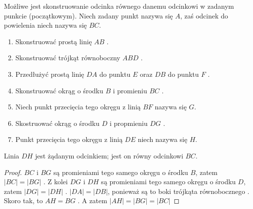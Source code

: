 \documentclass[12pt, a4paper]{scrartcl}
\begin{document}
\begin{theorem}

Możliwe jest skonstruowanie odcinka równego danemu odcinkowi w zadanym punkcie
(początkowym). Niech zadany punkt nazywa się \(A\), zaś odcinek do powielenia
niech nazywa się \(BC\).

\begin{enumerate}
    \item Skonstruować prostą linię \(AB\) .
    \item Skonstruować trójkąt równoboczny \(ABD\) .
    \item Przedłużyć prostą linię \(DA\) do punktu \(E\) oraz \(DB\) do punktu \(F\)
        .
    \item Skonstruować okrąg o środku \(B\) i promieniu \(BC\) .
    \item Niech punkt przecięcia tego okręgu z linią \(BF\) nazywa się \(G\).
    \item Skostruować okrąg o środku \(D\) i propmieniu \(DG\) .
    \item Punkt przecięcia tego okręgu z linią \(DE\) niech nazywa się \(H\).
\end{enumerate}

Linia \(DH\) jest żądanym odcinkiem; jest on równy odcinkowi \(BC\).

\pagebreak
\begin{figure}[h!]
    \begin{center}
    \end{center}
\end{figure}

\begin{proof}
    \(BC\) i \(BG\) są promieniami tego samego okręgu o środku \(B\), zatem
    \(|BC| = |BG|\) . Z kolei \(DG\) i \(DH\) są promieniami tego
    samego okręgu o środku \(D\), zatem \(|DG| = |DH|\) . \(|DA| =
    |DB|\), ponieważ są to boki trójkąta równobocznego . Skoro tak,
    to \(AH = BG\) . A zatem \(|AH| = |BG| = |BC|\) 
\end{proof}
\end{theorem}
\end{document}
